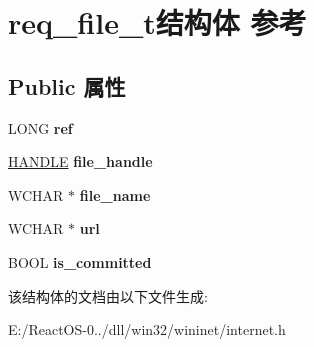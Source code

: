 \hypertarget{structreq__file__t}{}\section{req\+\_\+file\+\_\+t结构体 参考}
\label{structreq__file__t}
\subsection*{Public 属性}
\begin{DoxyCompactItemize}
\item 
\mbox{\label{structreq__file__t_a03213c7351736cbad0f30ebd8e489f14}} 
L\+O\+NG {\bfseries ref}
\item 
\mbox{\label{structreq__file__t_afb06f62a23eaa9214a6f1b7d4fee0dde}} 
\hyperlink{interfacevoid}{H\+A\+N\+D\+LE} {\bfseries file\+\_\+handle}
\item 
\mbox{\label{structreq__file__t_a198b7429bf81b54339996e22e063fb48}} 
W\+C\+H\+AR $\ast$ {\bfseries file\+\_\+name}
\item 
\mbox{\label{structreq__file__t_a9aacc65a45eef394d57fba35e0b8aef6}} 
W\+C\+H\+AR $\ast$ {\bfseries url}
\item 
\mbox{\label{structreq__file__t_aa740188bd543f61aff046269c1ffbef4}} 
B\+O\+OL {\bfseries is\+\_\+committed}
\end{DoxyCompactItemize}


该结构体的文档由以下文件生成\+:\begin{DoxyCompactItemize}
\item 
E\+:/\+React\+O\+S-\/0../dll/win32/wininet/internet.\+h\end{DoxyCompactItemize}

